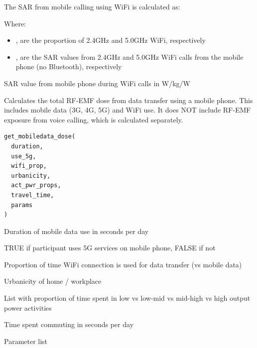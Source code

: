 \documentclass[a4paper]{book}
\begin{document}
%
\begin{Details}
The SAR from mobile calling using WiFi is calculated as:

Where:
\begin{itemize}

\item{} ,  are the proportion of 2.4GHz and 5.0GHz WiFi, respectively
\item{} ,  are the SAR values from 2.4GHz and 5.0GHz WiFi calls from the mobile phone (no Bluetooth), respectively

\end{itemize}

\end{Details}
%
\begin{Value}
SAR value from mobile phone during WiFi calls in W/kg/W
\end{Value}
%
\begin{Description}
Calculates the total RF-EMF dose from data transfer using a mobile phone.
This includes mobile data (3G, 4G, 5G) and WiFi use.
It does NOT include RF-EMF exposure from voice calling, which is calculated separately.
\end{Description}
%
\begin{Usage}
\begin{verbatim}
get_mobiledata_dose(
  duration,
  use_5g,
  wifi_prop,
  urbanicity,
  act_pwr_props,
  travel_time,
  params
)
\end{verbatim}
\end{Usage}
%
\begin{Arguments}
\begin{ldescription}
\item[\code{duration}] Duration of mobile data use in seconds per day

\item[\code{use\_5g}] TRUE if participant uses 5G services on mobile phone, FALSE if not

\item[\code{wifi\_prop}] Proportion of time WiFi connection is used for data transfer (vs mobile data)

\item[\code{urbanicity}] Urbanicity of home / workplace

\item[\code{act\_pwr\_props}] List with proportion of time spent in low vs low-mid vs mid-high vs high output power activities

\item[\code{travel\_time}] Time spent commuting in seconds per day

\item[\code{params}] Parameter list
\end{ldescription}
\end{Arguments}
\end{document}
